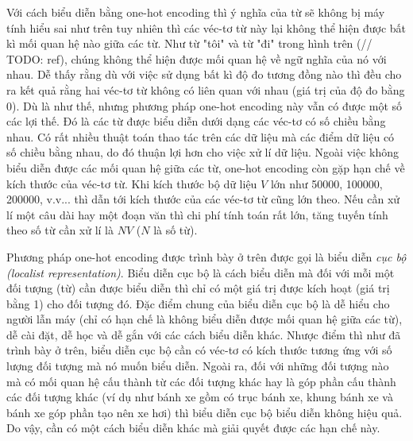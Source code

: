 Với cách biểu diễn bằng one-hot encoding thì ý nghĩa của từ sẽ không bị máy tính hiểu sai như trên tuy nhiên thì các véc-tơ từ này lại không thể hiện được bất kì mối quan hệ nào giữa các từ. Như từ "tôi" và từ "đi" trong hình trên (// TODO: ref), chúng không thể hiện được mối quan hệ về ngữ nghĩa của nó với nhau. Dễ thấy rằng dù với việc sử dụng bất kì độ đo tương đồng nào thì đều cho ra kết quả rằng hai véc-tơ từ không có liên quan với nhau (giá trị của độ đo bằng 0). Dù là như thế, nhưng phương pháp one-hot encoding này vẫn có được một số các lợi thế. Đó là các từ được biểu diễn dưới dạng các véc-tơ có số chiều bằng nhau. Có rất nhiều thuật toán thao tác trên các dữ liệu mà các điểm dữ liệu có số chiều bằng nhau, do đó thuận lợi hơn cho việc xử lí dữ liệu. Ngoài việc không biểu diễn được các mối quan hệ giữa các từ, one-hot encoding còn gặp hạn chế về kích thước của véc-tơ từ. Khi kích thước bộ dữ liệu $V$ lớn như 50000, 100000, 200000, v.v... thì dẫn tới kích thước của các véc-tơ từ cũng lớn theo. Nếu cần xử lí một câu dài hay một đoạn văn thì chi phí tính toán rất lớn, tăng tuyến tính theo số từ cần xử lí là $NV$ ($N$ là số từ).

Phương pháp one-hot encoding được trình bày ở trên được gọi là biểu diễn \textit{cục bộ (localist representation)}. Biểu diễn cục bộ là cách biểu diễn mà đối với mỗi một đối tượng (từ) cần được biểu diễn thì chỉ có một giá trị được kích hoạt (giá trị bằng 1) cho đối tượng đó. Đặc điểm chung của biểu diễn cục bộ là dễ hiểu cho người lẫn máy (chỉ có hạn chế là không biểu diễn được mối quan hệ giữa các từ), dễ cài đặt, dễ học và dễ gắn với các cách biểu diễn khác. Nhược điểm thì như đã trình bày ở trên, biểu diễn cục bộ cần có véc-tơ có kích thước tương ứng với số lượng đối tượng mà nó muốn biểu diễn. Ngoài ra, đối với những đối tượng nào mà có mối quan hệ cấu thành từ các đối tượng khác hay là góp phần cấu thành các đối tượng khác (ví dụ như bánh xe gồm có trục bánh xe, khung bánh xe và bánh xe góp phần tạo nên xe hơi) thì biểu diễn cục bộ biểu diễn không hiệu quả. Do vậy, cần có một cách biểu diễn khác mà giải quyết được các hạn chế này.

